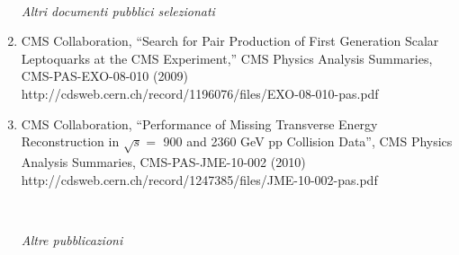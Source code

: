 \documentclass[10pt]{letter}
\begin{document}
\begin{enumerate}
~\\
\begin{center} \textit{Altri documenti pubblici selezionati} \\ \end{center}

\item CMS Collaboration, 
  ``Search for Pair Production of First Generation Scalar Leptoquarks at the CMS Experiment,''
  CMS Physics Analysis Summaries, CMS-PAS-EXO-08-010 (2009) \\
  http://cdsweb.cern.ch/record/1196076/files/EXO-08-010-pas.pdf 

\item CMS Collaboration,
  ``Performance of Missing Transverse Energy Reconstruction in $\sqrt{s}=$ 900 and 2360 GeV pp Collision Data'',
  CMS Physics Analysis Summaries, CMS-PAS-JME-10-002 (2010) \\
  http://cdsweb.cern.ch/record/1247385/files/JME-10-002-pas.pdf

~\\
\begin{center} \textit{Altre pubblicazioni} \\ \end{center}


\end{enumerate}
\end{document}
